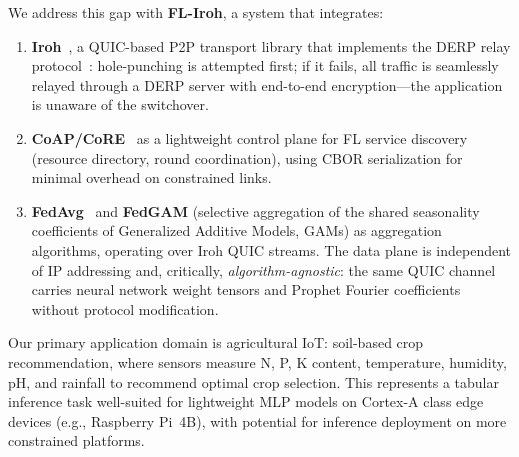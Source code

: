 ﻿\documentclass[journal]{IEEEtran}
\begin{document}
We address this gap with \textbf{FL-Iroh}, a system that integrates:

\begin{enumerate}
    \item \textbf{Iroh}~\cite{iroh2024}, a QUIC-based P2P transport library that implements the DERP relay protocol~\cite{tailscale2023}: hole-punching is attempted first; if it fails, all traffic is seamlessly relayed through a DERP server with end-to-end encryption---the application is unaware of the switchover.
    \item \textbf{CoAP/CoRE}~\cite{rfc7252} as a lightweight control plane for FL service discovery (resource directory, round coordination), using CBOR serialization for minimal overhead on constrained links.
    \item \textbf{FedAvg}~\cite{mcmahan2017} and \textbf{FedGAM} (selective aggregation of the shared seasonality coefficients of Generalized Additive Models, GAMs) as aggregation algorithms, operating over Iroh QUIC streams. The data plane is independent of IP addressing and, critically, \emph{algorithm-agnostic}: the same QUIC channel carries neural network weight tensors and Prophet Fourier coefficients without protocol modification.
\end{enumerate}

Our primary application domain is agricultural IoT: soil-based crop recommendation, where sensors measure N, P, K content, temperature, humidity, pH, and rainfall to recommend optimal crop selection. This represents a tabular inference task well-suited for lightweight MLP models on Cortex-A class edge devices (e.g., Raspberry Pi~4B), with potential for inference deployment on more constrained platforms.
\end{document}

